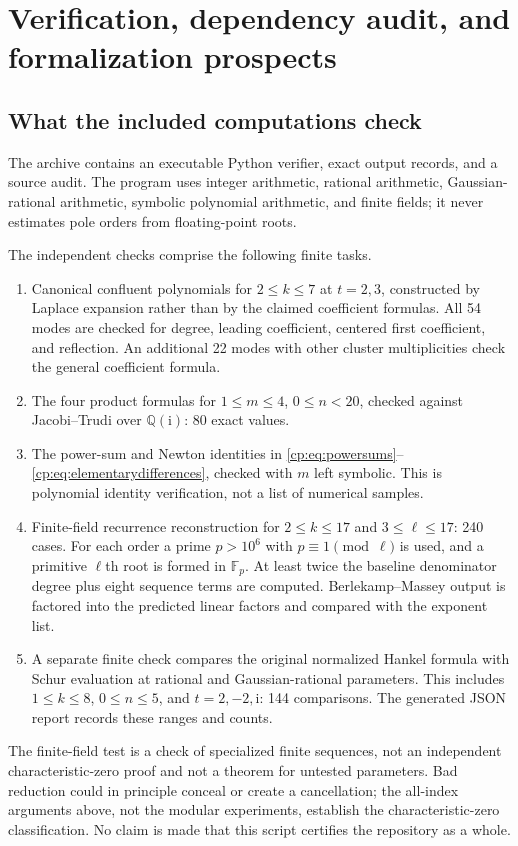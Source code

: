 \documentclass[11pt]{article}
\theoremstyle{definition}
\theoremstyle{remark}
\newcommand{\Q}{\mathbb Q}
\newcommand{\ii}{\mathrm i}
\theoremstyle{definition}
\theoremstyle{plain}
\numberwithin{equation}{section}
\begin{document}
\section{Verification, dependency audit, and formalization prospects}
\label{cp:sec:verification}

\subsection{What the included computations check}
The archive contains an executable Python verifier, exact output records,
and a source audit. The program uses integer arithmetic, rational arithmetic,
Gaussian-rational arithmetic, symbolic polynomial arithmetic, and finite
fields; it never estimates pole orders from floating-point roots.

The independent checks comprise the following finite tasks.
\begin{enumerate}
\item Canonical confluent polynomials for $2\le k\le7$ at $t=2,3$,
constructed by Laplace expansion rather than by the claimed coefficient
formulas. All 54 modes are checked for degree, leading coefficient,
centered first coefficient, and reflection. An additional 22 modes with
other cluster multiplicities check the general coefficient formula.
\item The four product formulas for $1\le m\le4$, $0\le n<20$,
checked against Jacobi--Trudi over $\Q(\ii)$: 80 exact values.
\item The power-sum and Newton identities in
\eqref{cp:eq:powersums}--\eqref{cp:eq:elementarydifferences}, checked with $m$
left symbolic. This is polynomial identity verification, not a list of
numerical samples.
\item Finite-field recurrence reconstruction for $2\le k\le17$ and
$3\le\ell\le17$: 240 cases. For each order a prime $p>10^6$ with
$p\equiv1\pmod\ell$ is used, and a primitive $\ell$th root is formed
in $\mathbb F_p$. At least twice the baseline denominator degree plus
eight sequence terms are computed. Berlekamp--Massey output is factored
into the predicted linear factors and compared with the exponent list.
\item A separate finite check compares the original normalized Hankel
formula with Schur evaluation at rational and Gaussian-rational parameters.
This includes $1\le k\le8$, $0\le n\le5$, and $t=2,-2,\ii$: 144 comparisons.
The generated JSON report records these ranges and counts.
\end{enumerate}
The finite-field test is a check of specialized finite sequences, not an
independent characteristic-zero proof and not a theorem for untested
parameters. Bad reduction could in principle conceal or create a
cancellation; the all-index arguments above, not the modular experiments,
establish the characteristic-zero classification. No claim is made that
this script certifies the repository as a whole.
\end{document}
